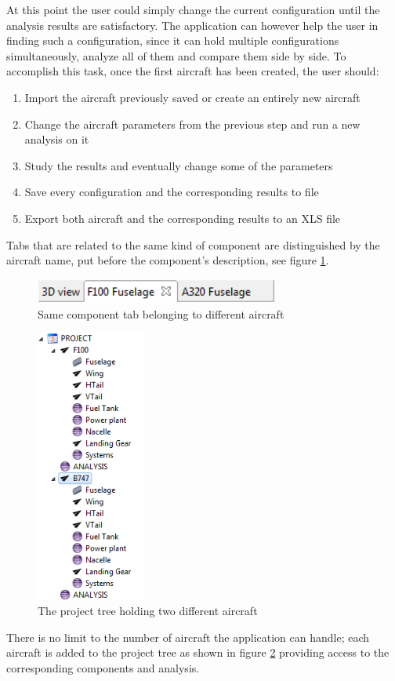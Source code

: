 %
At this point the user could simply change the current configuration until the analysis results are satisfactory. The application can however help the user in finding such a configuration, since it can hold multiple configurations simultaneously, analyze all of them and compare them side by side. To accomplish this task, once the first aircraft has been created, the user should:
%
\begin{enumerate}
	\setlength{\itemsep}{\medspacing}
	\item Import the aircraft previously saved or create an entirely new aircraft
	\item Change the aircraft parameters from the previous step and run a new analysis on it
	\item Study the results and eventually change some of the parameters
	\item Save every configuration and the corresponding results to file
	\item Export both aircraft and the corresponding results to an XLS file
\end{enumerate}
%
Tabs that are related to the same kind of component are distinguished by the aircraft name, put before the component's description, see figure \ref{fig:tabId}.
%
\begin{figure}[H]
	\centering
	\includegraphics[width=8cm]{images/gui/tabId}
	\caption{Same component tab belonging to different aircraft}
	\label{fig:tabId}
\end{figure}
%
\begin{figure}[H]
	\centering
	\includegraphics[height=9cm]{images/gui/projectTreeMulti}
	\caption{The project tree holding two different aircraft}
	\label{fig:projectTreeMulti}
\end{figure}
%
There is no limit to the number of aircraft the application can handle; each aircraft is added to the project tree as shown in figure \ref{fig:projectTreeMulti} providing access to the corresponding components and analysis.
%
